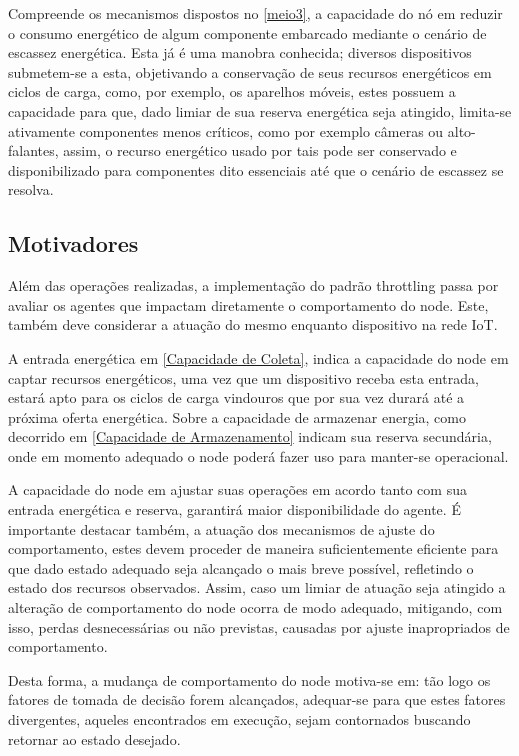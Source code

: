 Compreende os mecanismos dispostos no \ref{meio3}, a capacidade do nó em reduzir o consumo energético de algum componente embarcado mediante o cenário de escassez energética. Esta já é uma manobra conhecida; diversos dispositivos submetem-se a esta, objetivando a conservação de seus recursos energéticos em ciclos de carga, como, por exemplo, os aparelhos móveis, estes possuem a capacidade para que, dado limiar de sua reserva energética seja atingido, limita-se ativamente componentes menos críticos, como por exemplo câmeras ou alto-falantes, assim, o recurso energético usado por tais pode ser conservado e disponibilizado para componentes dito essenciais até que o cenário de escassez se resolva. 


\subsection{Motivadores}

Além das operações realizadas, a implementação do padrão throttling passa por avaliar os agentes que impactam diretamente o comportamento do node. Este, também deve considerar a atuação do mesmo enquanto dispositivo na rede \acs{IoT}. 

A entrada energética em \ref{Capacidade de Coleta}, indica a capacidade do node em captar recursos energéticos, uma vez que um dispositivo receba esta entrada, estará apto para os ciclos de carga vindouros que por sua vez durará até a próxima oferta energética. Sobre a capacidade de armazenar energia, como decorrido em \ref{Capacidade de Armazenamento} indicam sua reserva secundária, onde em momento adequado o node poderá fazer uso para manter-se operacional.  

A capacidade do node em ajustar suas operações em acordo tanto com sua entrada energética e reserva, garantirá maior disponibilidade do agente. É importante destacar também, a atuação dos mecanismos de ajuste do comportamento, estes devem proceder de maneira suficientemente eficiente para que dado estado adequado seja alcançado o mais breve possível, refletindo o estado dos recursos observados. Assim, caso um limiar de atuação seja atingido a alteração de comportamento do node ocorra de modo adequado, mitigando, com isso, perdas desnecessárias ou não previstas, causadas por ajuste inapropriados de comportamento.

Desta forma, a mudança de comportamento do node motiva-se em: tão logo os fatores de tomada de decisão forem alcançados, adequar-se para que estes fatores divergentes, aqueles encontrados em execução, sejam contornados buscando retornar ao estado desejado. 

